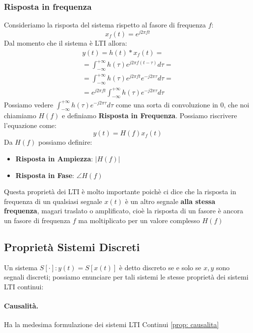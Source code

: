 \subsubsection{Risposta in frequenza}
Consideriamo la risposta del sistema rispetto al fasore di frequenza $f$:
\begin{equation*}
    x_f(t) = e^{j2\pi ft}
\end{equation*}
Dal momento che il sistema è LTI allora:
\begin{align*}
    y(t) = h(t) \ast x_f(t) = \\
    = \int_{-\infty}^{+\infty} h(\tau)e^{j2\pi f(t - \tau)} d\tau =\\
    = \int_{-\infty}^{+\infty} h(\tau)e^{j2\pi ft}e^{-j2\pi\tau} d\tau =\\
    = e^{j2\pi ft} \int_{-\infty}^{+\infty} h(\tau) e^{-j2\pi\tau} d\tau 
\end{align*}
Possiamo vedere $\int_{-\infty}^{+\infty} h(\tau) e^{-j2\pi\tau} d\tau$ come una sorta di convoluzione in 0, che noi chiamiamo $H(f)$ e definiamo \textbf{Risposta in Frequenza}. Possiamo riscrivere l'equazione come:
\begin{equation}
    y(t) = H(f)x_f(t)
\end{equation}
Da $H(f)$ possiamo definire:
\begin{itemize}
    \item \textbf{Risposta in Ampiezza}: $|H(f)|$
    \item \textbf{Risposta in Fase}: $\angle H(f)$
\end{itemize}
Questa proprietà dei LTI è molto importante poichè ci dice che la risposta in frequenza di un qualsiasi segnale $x(t)$ è un altro segnale \textbf{alla stessa frequenza}, magari traslato o amplificato,
cioè la risposta di un fasore è ancora un fasore di frequenza $f$ ma moltiplicato per un valore complesso $H(f)$



\subsection{Proprietà Sistemi Discreti}
Un sistema $S[\cdot]:y(t) = S[x(t)]$ è detto discreto se e solo se $x,y$ sono segnali discreti; possiamo enunciare per tali sistemi le stesse proprietà dei sistemi LTI continui:
\paragraph{Causalità.}
Ha la medesima formulazione dei sistemi LTI Continui \eqref{prop: causalita} 

